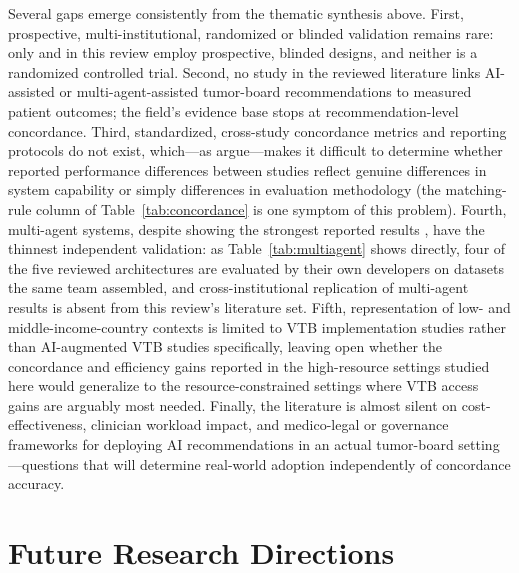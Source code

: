 \documentclass[acmsmall,screen=true,review=false,nonacm=true]{acmart}
\begin{document}
Several gaps emerge consistently from the thematic synthesis above. First, prospective, multi-institutional, randomized or blinded validation remains rare: only \citet{pinninti2026} and \citet{seshachalam2026} in this review employ prospective, blinded designs, and neither is a randomized controlled trial. Second, no study in the reviewed literature links AI-assisted or multi-agent-assisted tumor-board recommendations to measured patient outcomes; the field's evidence base stops at recommendation-level concordance. Third, standardized, cross-study concordance metrics and reporting protocols do not exist, which---as \citet{carl2024} argue---makes it difficult to determine whether reported performance differences between studies reflect genuine differences in system capability or simply differences in evaluation methodology (the matching-rule column of Table~\ref{tab:concordance} is one symptom of this problem). Fourth, multi-agent systems, despite showing the strongest reported results \citep{liu2026}, have the thinnest independent validation: as Table~\ref{tab:multiagent} shows directly, four of the five reviewed architectures are evaluated by their own developers on datasets the same team assembled, and cross-institutional replication of multi-agent results is absent from this review's literature set. Fifth, representation of low- and middle-income-country contexts is limited to VTB implementation studies \citep{thiagarajan2023} rather than AI-augmented VTB studies specifically, leaving open whether the concordance and efficiency gains reported in the high-resource settings studied here would generalize to the resource-constrained settings where VTB access gains are arguably most needed. Finally, the literature is almost silent on cost-effectiveness, clinician workload impact, and medico-legal or governance frameworks for deploying AI recommendations in an actual tumor-board setting---questions that will determine real-world adoption independently of concordance accuracy.

\section{Future Research Directions}
\label{sec:future}
\end{document}
